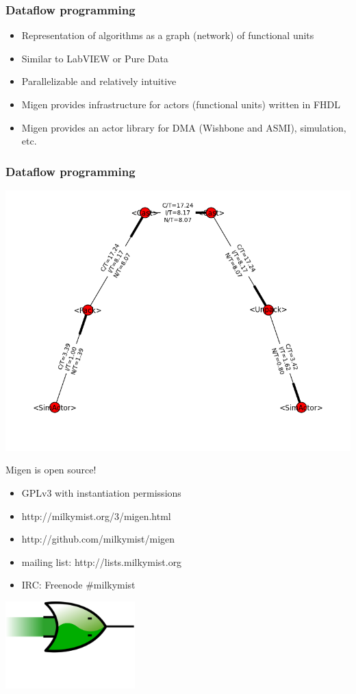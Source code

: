 \documentclass[serif,mathserif]{beamer}
\begin{document}
\begin{frame}
\frametitle{Dataflow programming}
\begin{itemize}
\item Representation of algorithms as a graph (network) of functional units
\item Similar to LabVIEW or Pure Data
\item Parallelizable and relatively intuitive
\item Migen provides infrastructure for actors (functional units) written in FHDL
\item Migen provides an actor library for DMA (Wishbone and ASMI), simulation, etc.
\end{itemize}
\end{frame}

\begin{frame}
\frametitle{Dataflow programming}
\includegraphics[width=\textwidth]{agperf.png}
\end{frame}

\begin{frame}
Migen is open source!
\begin{itemize}
\item GPLv3 with instantiation permissions
\item http://milkymist.org/3/migen.html
\item http://github.com/milkymist/migen
\item mailing list: http://lists.milkymist.org
\item IRC: Freenode \#milkymist
\end{itemize}

\centering \includegraphics[width=5cm]{migen_logo.png}

\end{frame}
\end{document}
